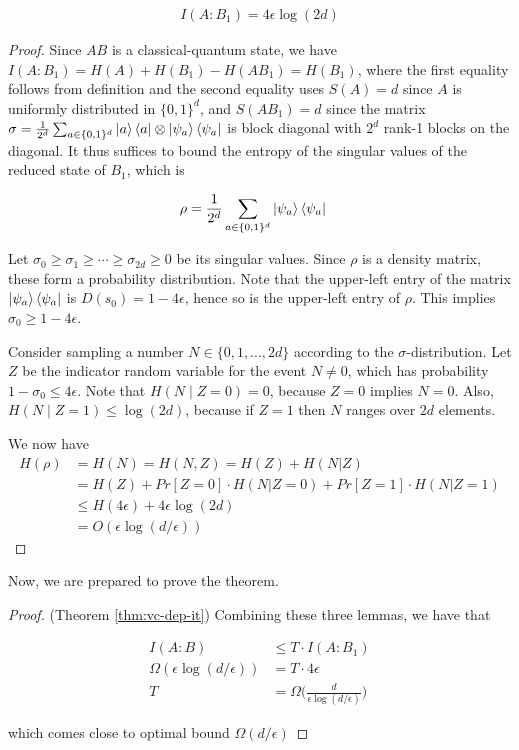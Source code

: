 \documentclass[main.tex]{subfiles}
\begin{document}
\begin{lemma}
\begin{align*}
I(A:B_1) = 4 \epsilon \log(2d)
\end{align*}

\begin{proof}
Since $AB$ is a classical-quantum state, we have $I(A : B_1) = H(A) + H(B_1) - H(AB_1) = H(B_1)$,
where the first equality follows from definition and the second equality uses $S(A) = d$ since
$A$ is uniformly distributed in $\{0,1\}^d$, and $S(AB_1) = d$ since the matrix $\sigma = \frac{1}{2^d} \sum_{a \in \{0,1\}^d} \ket{a}\bra{a} \otimes \ket{\psi_a} \bra{\psi_a}$ is block diagonal with $2^d$ rank-1 blocks on the diagonal. It thus suffices to bound the entropy of the singular values of the reduced state of $B_1$, which is

\begin{align*}
\rho &= \frac{1}{2^d} \sum_{a \in \{0, 1\}^d} \ket{\psi_a} \bra{\psi_a}	
\end{align*}

Let $\sigma_0 \geq \sigma_1 \geq \cdots \geq \sigma_{2d} \geq 0$ be its singular values. Since $\rho$ is a density matrix, these form a probability distribution. Note that the upper-left entry of the matrix $\ket{\psi_a}\bra{\psi_a}$ is $D(s_0) = 1-4\epsilon$, hence so is the upper-left entry of $\rho$. This implies $\sigma_0 \geq 1 − 4\epsilon$. 

Consider sampling a number $N \in \{0,1,...,2d\}$ according to the $\sigma$-distribution. Let $Z$ be the indicator random variable for the event $N \neq 0$, which has probability $1 - \sigma_0 \leq 4 \epsilon$. Note that $H(N\mid Z=0)=0$, because $Z=0$ implies $N = 0$. Also, $H(N \mid Z = 1) \leq \log(2d)$, because if $Z = 1$ then $N$ ranges over $2d$ elements. 

We now have
\begin{align*}
H(\rho) &= H(N) = H(N,Z) = H(Z) + H(N | Z)\\
&= H(Z) + Pr[Z = 0] \cdot H(N | Z = 0) + Pr[Z = 1] \cdot H(N | Z = 1) \\
&\leq H(4\epsilon)+4\epsilon \log(2d)\\
&= O(\epsilon \log(d/\epsilon)) \tag{Using the Taylor series of the logarithm}
\end{align*}
\end{proof}
\end{lemma}

Now, we are prepared to prove the theorem.

\begin{proof}(Theorem \ref{thm:vc-dep-it})
Combining these three lemmas, we have that 

\begin{align*}
I(A:B) &\leq T \cdot I(A:B_1) \\
\Omega(\epsilon \log(d/\epsilon)) &= T \cdot 4 \epsilon \\
T &= \Omega \Big(\frac{d}{\epsilon \log(d/\epsilon)}\Big)
\end{align*}

which comes close to optimal bound $\Omega (d / \epsilon)$
\end{proof}
\end{document}
